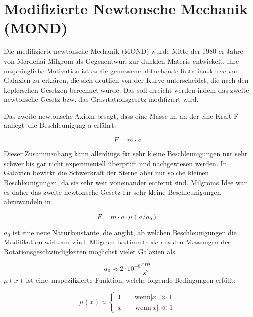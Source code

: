 \section{Modifizierte Newtonsche Mechanik (MOND)} \label{MOND}


Die modifizierte newtonsche Mechanik (MOND) wurde Mitte der 1980-er
Jahre von Mordehai Milgrom als Gegenentwurf zur dunklen Materie
entwickelt. Ihre urspr\"ungliche Motivation ist es die gemessene
abflachende Rotationskurve von Galaxien zu erkl\"aren, die sich
deutlich von der Kurve unterscheidet, die nach den keplerschen
Gesetzen berechnet wurde. Das soll erreicht werden indem das zweite
newtonsche Gesetz bzw. das Gravitationsgesetz modifiziert wird.




Das zweite newtonsche Axiom besagt, dass eine Masse m, an der eine Kraft
F anliegt, die Beschleunigung a erf\"ahrt:

\begin{equation}
F=m\cdot a
\end{equation}

Dieser Zusammenhang kann allerdings f\"ur sehr kleine Beschleunigungen
nur sehr schwer bis gar nicht experimentell \"uberpr\"uft und
nachgewiesen werden. In Galaxien bewirkt die Schwerkraft der Sterne
aber nur solche kleinen Beschleunigungen, da sie sehr weit voneinander
entfernt sind. Milgroms Idee \cite{Bekenstein1984} war es daher das zweite newtonsche
Gesetz f\"ur sehr kleine Beschleunigungen abzuwandeln in

\begin{equation}
F=m\cdot a\cdot \mu (a/a_{0})
\end{equation}

 $a_{0}$ ist eine neue Naturkonstante, die angibt, ab welchen
Beschleunigungen die Modifikation wirksam wird. Milgrom bestimmte sie
aus den Messungen der Rotationsgeschwindigkeiten m\"oglichst vieler
Galaxien als 

\begin{equation*}
a_{0}\approx 2 \cdot 10^{-8}\frac{\mathit{cm}}{s^{2}}
\end{equation*}
$\mu (x)$ ist eine unspezifizierte Funktion, welche folgende
Bedingungen erf\"ullt:

\begin{equation*}
\mu \left( x \right) \approx
\begin{cases}
1 \qquad \mathrm{wenn} \left| x \right| \gg 1 \\
x \qquad \mathrm{wenn} \left| x \right| \ll 1
\end{cases}
\end{equation*}

